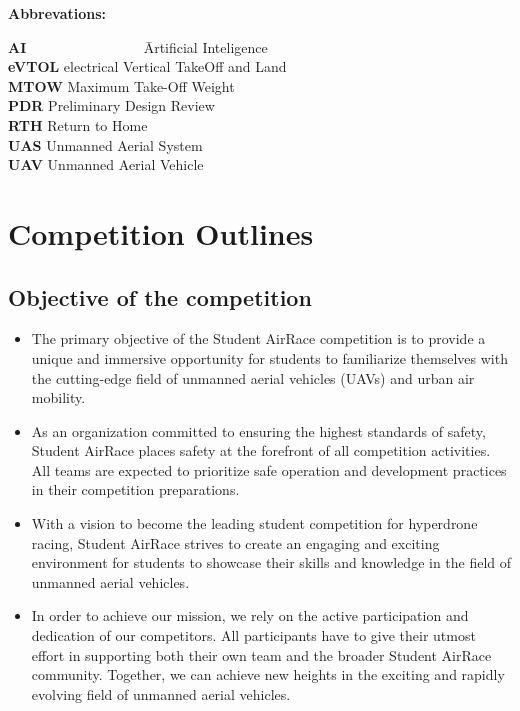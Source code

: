 {\bf Abbrevations:}
\begin{tabbing}
  {\bf AI~~~~~~~~~~~~~~} \= Artificial Inteligence
  \\{\bf eVTOL} \> electrical Vertical TakeOff and Land
  \\{\bf MTOW} \> Maximum Take-Off Weight
  \\{\bf PDR} \> Preliminary Design Review
  \\{\bf RTH} \> Return to Home
  \\{\bf UAS} \> Unmanned Aerial System
  \\{\bf UAV} \> Unmanned Aerial Vehicle
\end{tabbing}




\newpage

\newpage

 \section{Competition Outlines}
  
\subsection{Objective of the competition}

\begin{itemize}
  \item The primary objective of the Student AirRace competition is to provide a unique and immersive opportunity for students to familiarize themselves with the cutting-edge field of unmanned aerial vehicles (UAVs) and urban air mobility.
  \item As an organization committed to ensuring the highest standards of safety, Student AirRace places safety at the forefront of all competition activities. All teams are expected to prioritize safe operation and development practices in their competition preparations.
  \item With a vision to become the leading student competition for hyperdrone racing, Student AirRace strives to create an engaging and exciting environment for students to showcase their skills and knowledge in the field of unmanned aerial vehicles.
  \item In order to achieve our mission, we rely on the active participation and dedication of our competitors. All participants have to give their utmost effort in supporting both their own team and the broader Student AirRace community. Together, we can achieve new heights in the exciting and rapidly evolving field of unmanned aerial vehicles.
\end{itemize}

